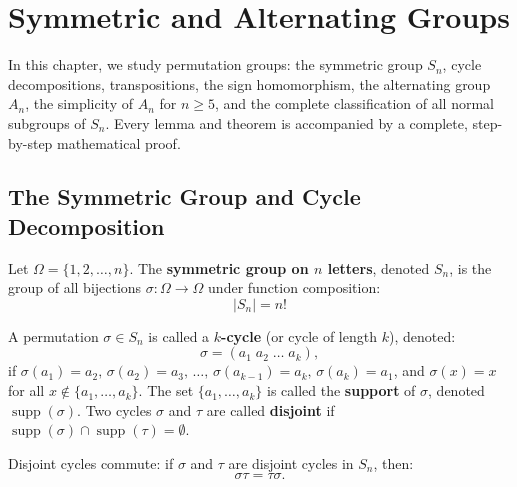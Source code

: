 \chapter{Symmetric and Alternating Groups}
\label{chap:unit3}

In this chapter, we study permutation groups: the symmetric group $S_n$, cycle decompositions, transpositions, the sign homomorphism, the alternating group $A_n$, the simplicity of $A_n$ for $n \ge 5$, and the complete classification of all normal subgroups of $S_n$. Every lemma and theorem is accompanied by a complete, step-by-step mathematical proof.

\section{The Symmetric Group and Cycle Decomposition}
\label{sec:symmetric_group}

\begin{definition}
Let $\Omega = \{1, 2, \dots, n\}$. The \textbf{symmetric group on $n$ letters}, denoted $S_n$, is the group of all bijections $\sigma: \Omega \to \Omega$ under function composition:
\begin{equation}
|S_n| = n!
\end{equation}
\end{definition}

\begin{definition}
A permutation $\sigma \in S_n$ is called a \textbf{$k$-cycle} (or cycle of length $k$), denoted:
\begin{equation}
\sigma = (a_1 \; a_2 \; \dots \; a_k),
\end{equation}
if $\sigma(a_1) = a_2, \, \sigma(a_2) = a_3, \, \dots, \, \sigma(a_{k-1}) = a_k, \, \sigma(a_k) = a_1$, and $\sigma(x) = x$ for all $x \notin \{a_1, \dots, a_k\}$.
The set $\{a_1, \dots, a_k\}$ is called the \textbf{support} of $\sigma$, denoted $\operatorname{supp}(\sigma)$.
Two cycles $\sigma$ and $\tau$ are called \textbf{disjoint} if $\operatorname{supp}(\sigma) \cap \operatorname{supp}(\tau) = \emptyset$.
\end{definition}

\begin{proposition}
\label{prop:disjoint_commute}
Disjoint cycles commute: if $\sigma$ and $\tau$ are disjoint cycles in $S_n$, then:
\begin{equation}
\sigma \tau = \tau \sigma.
\end{equation}
\end{proposition}

